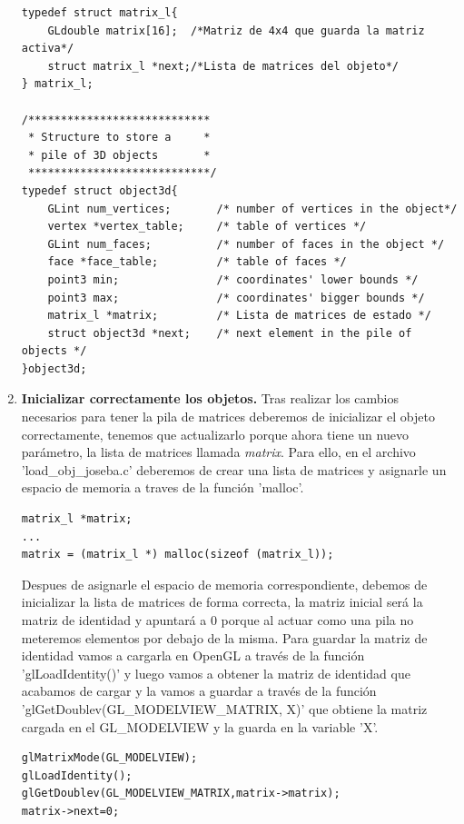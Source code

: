 \documentclass[12pt,a4paper]{article}
\begin{document}
\begin{enumerate}
\begin{lstlisting}
typedef struct matrix_l{
    GLdouble matrix[16];  /*Matriz de 4x4 que guarda la matriz activa*/
    struct matrix_l *next;/*Lista de matrices del objeto*/
} matrix_l;

/****************************
 * Structure to store a     *
 * pile of 3D objects       *
 ****************************/
typedef struct object3d{
    GLint num_vertices;       /* number of vertices in the object*/
    vertex *vertex_table;     /* table of vertices */
    GLint num_faces;          /* number of faces in the object */
    face *face_table;         /* table of faces */
    point3 min;               /* coordinates' lower bounds */
    point3 max;               /* coordinates' bigger bounds */
    matrix_l *matrix;         /* Lista de matrices de estado */
    struct object3d *next;    /* next element in the pile of objects */
}object3d;
\end{lstlisting}




\item \textbf{Inicializar correctamente los objetos.}\newline
Tras realizar los cambios necesarios para tener la pila de matrices deberemos de inicializar el objeto correctamente, tenemos que actualizarlo porque ahora tiene un nuevo parámetro, la lista de matrices llamada \textit{matrix}.\newline
Para ello, en el archivo 'load\_obj\_joseba.c' deberemos de crear una lista de matrices y asignarle un espacio de memoria a traves de la función 'malloc'.
\begin{lstlisting}
matrix_l *matrix;
...
matrix = (matrix_l *) malloc(sizeof (matrix_l));
\end{lstlisting}

Despues de asignarle el espacio de memoria correspondiente, debemos de inicializar la lista de matrices de forma correcta, la matriz inicial será la matriz de identidad y apuntará a 0 porque al actuar como una pila no meteremos elementos por debajo de la misma. Para guardar la matriz de identidad vamos a cargarla en OpenGL a través de la función 'glLoadIdentity()' y luego vamos a obtener la matriz de identidad que acabamos de cargar y la vamos a guardar a través de la función 'glGetDoublev(GL\_MODELVIEW\_MATRIX, X)' que obtiene la matriz cargada en el GL\_MODELVIEW y la guarda en la variable 'X'.\newline

\begin{lstlisting}
glMatrixMode(GL_MODELVIEW);
glLoadIdentity();
glGetDoublev(GL_MODELVIEW_MATRIX,matrix->matrix);
matrix->next=0;
\end{lstlisting}




\end{enumerate}
\end{document}
